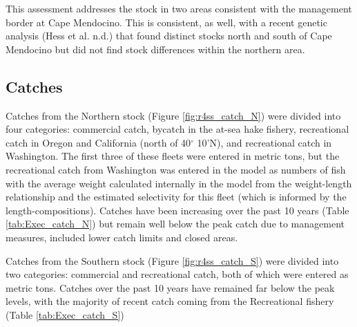 \documentclass[12pt,]{article}
\begin{document}
This assessment addresses the stock in two areas consistent with the
management border at Cape Mendocino. This is consistent, as well, with a
recent genetic analysis (Hess et al. n.d.) that found distinct stocks
north and south of Cape Mendocino but did not find stock differences
within the northern area.

\FloatBarrier

\subsection*{Catches}\label{catches}

Catches from the Northern stock (Figure \ref{fig:r4ss_catch_N}) were
divided into four categories: commercial catch, bycatch in the at-sea
hake fishery, recreational catch in Oregon and California (north of
40\(^\circ\) 10'N), and recreational catch in Washington. The first
three of these fleets were entered in metric tons, but the recreational
catch from Washington was entered in the model as numbers of fish with
the average weight calculated internally in the model from the
weight-length relationship and the estimated selectivity for this fleet
(which is informed by the length-compositions). Catches have been
increasing over the past 10 years (Table \ref{tab:Exec_catch_N}) but
remain well below the peak catch due to management measures, included
lower catch limits and closed areas.

Catches from the Southern stock (Figure \ref{fig:r4ss_catch_S}) were
divided into two categories: commercial and recreational catch, both of
which were entered as metric tons. Catches over the past 10 years have
remained far below the peak levels, with the majority of recent catch
coming from the Recreational fishery (Table \ref{tab:Exec_catch_S})

\FloatBarrier
\end{document}
